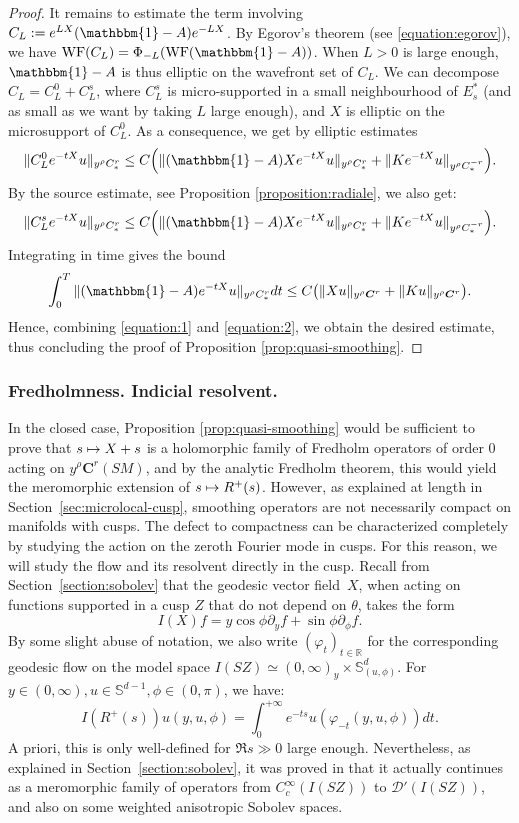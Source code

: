 \documentclass[10pt]{amsart}
\newcommand\mto{\mathchoice{\longmapsto}{\mapsto}{\mapsto}{\mapsto}}
\newcommand{\bC}{\boldsymbol{C}}
\newcommand{\R}{\mathbb{R}}
\newcommand{\Ss}{\mathbb{S}}
\newcommand{\ZZ}{I(SZ)}
\DeclareMathOperator{\WF}{WF}
\theoremstyle{plain}
\theoremstyle{definition}
\begin{document}
\begin{proof}
It remains to estimate the term involving $C_L := e^{LX}(\mathbbm{1}-A)e^{-LX}$. By Egorov's theorem (see \eqref{equation:egorov}), we have $\WF(C_L)= \Phi_{-L}(\WF(\mathbbm{1}-A))$. When $L>0$ is large enough, $\mathbbm{1}-A$ is thus elliptic on the wavefront set of $C_L$. We can decompose $C_L = C^0_L+C^s_L$, where $C^s_L$ is micro-supported in a small neighbourhood of $E^\ast_s$ (and as small as we want by taking $L$ large enough), and $X$ is elliptic on the microsupport of $C^0_L$. As a consequence, we get by elliptic estimates
\[
\|C_L^0 e^{-tX}u\|_{y^\rho C^r_*} \leq C\Bigl(\| (\mathbbm{1}-A)X e^{-tX}u\|_{y^\rho C^{r}_*} + \| K e^{-tX}u\|_{y^\rho C^{-r}_*}\Bigr).
\]
By the source estimate, see Proposition \ref{proposition:radiale}, we also get:
\[
\|C_L^s e^{-tX}u\|_{y^\rho C^r_*} \leq C\Bigl(\| (\mathbbm{1}-A)Xe^{-tX}u \|_{y^\rho C^r_*} + \| K e^{-tX}u\|_{y^\rho C^{-r}_*}\Bigr).
\]
Integrating in time gives the bound
\begin{equation}
\label{equation:2}
\int_0^T \| (\mathbbm{1}-A)e^{-tX} u\|_{y^\rho C^r_*} dt \leq C \bigl( \|Xu\|_{y^\rho \bC^r} + \|Ku\|_{y^\rho \bC^r} \bigr).
\end{equation}
Hence, combining \eqref{equation:1} and \eqref{equation:2}, we obtain the desired estimate, thus concluding the proof of Proposition \ref{prop:quasi-smoothing}.
\end{proof}

\subsubsection{Fredholmness. Indicial resolvent.}

\label{sssection:indicial-resolvent}

In the closed case, Proposition \ref{prop:quasi-smoothing} would be sufficient to prove that $s \mto X+s$ is a holomorphic family of Fredholm operators of order $0$ acting on $y^\rho \bC^r(SM)$, and by the analytic Fredholm theorem, this would yield the meromorphic extension of $s \mto R^+(s)$. However, as explained at length in Section~\ref{sec:microlocal-cusp}, smoothing operators are not necessarily compact on manifolds with cusps. The defect to compactness can be characterized completely by studying the action on the zeroth Fourier mode in cusps. For this reason, we will study the flow and its resolvent directly in the cusp. Recall from Section~\ref{section:sobolev} that the geodesic vector field~$X$, when acting on functions supported in a cusp $Z$ that do not depend on $\theta$, takes the form
\[
I(X)f = y \cos \phi \partial_y f + \sin\phi\partial_\phi f.
\]
By some slight abuse of notation, we also write $(\varphi_t)_{t \in \R}$ for the corresponding geodesic flow on the model space $\ZZ \simeq (0,\infty)_y \times \Ss^d_{(u,\phi)}$. For $y \in (0,\infty), u \in \Ss^{d-1}, \phi \in (0,\pi)$, we have:
\[
I(R^+(s)) u (y,u,\phi) = \int_0^{+\infty} e^{-t s} u(\varphi_{-t}(y,u,\phi)) dt.
\]
A priori, this is only well-defined for $\Re s\gg 0$ large enough. Nevertheless, as explained in Section~\ref{section:sobolev}, it was proved in \cite{Bonthonneau-Weich-17} that it actually continues as a meromorphic family of operators from $C^\infty_c(\ZZ)$ to $\mathcal{D}'(\ZZ)$, and also on some weighted anisotropic Sobolev spaces.
\end{document}
